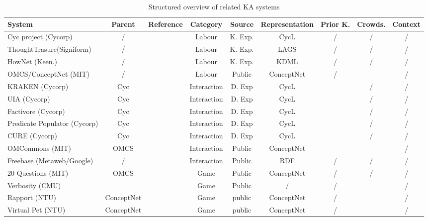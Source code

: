 \begin{landscape}
	\begin{table}[htb]
	\caption{Structured overview of related KA systems}
	\label{tab:related}
	\centering
	\begin{adjustbox}{width=1.6\textwidth}
	
	\begin{tabular}{lclcccccc}
		\hline
		System & Parent & Reference & Category & Source & Representation & Prior K. &  Crowds. & Context \\
		\hline
		Cyc project (Cycorp) & / & \parencite{Lenat1995} & Labour & K. Exp. & CycL & / & / & / \\
		ThoughtTrasure(Signiform) & / & \parencite{Mueller2003} & Labour & K. Exp. & LAGS & / & / & / \\
		HowNet (Keen.) & / & \parencite{Dong2010} & Labour & K. Exp. & KDML & / & / & / \\
		OMCS/ConceptNet (MIT) & / & \parencite{Singh2002a} & Labour & Public & ConceptNet & / & \checkmark & / \\
		KRAKEN (Cycorp) & Cyc & \parencite{Panton2002a} & Interaction & D. Exp & CycL & \checkmark & / & / \\
		UIA (Cycorp) & Cyc & \parencite{Witbrock2003UIA} & Interaction & D. Exp & CycL & \checkmark & / & / \\
		Factivore (Cycorp) & Cyc & \parencite{Witbrock2005} & Interaction & D. Exp & CycL & \checkmark & / & / \\
		Predicate Populator (Cycorp) & Cyc & \parencite{Witbrock2005} & Interaction & D. Exp & CycL & \checkmark & / & / \\
		CURE (Cycorp) & Cyc & \parencite{Witbrock2010} & Interaction & D. Exp & CycL & \checkmark & / & / \\
		OMCommons (MIT) & OMCS & \parencite{Speer2007} & Interaction & Public & ConceptNet & \checkmark & \checkmark & / \\
		Freebase (Metaweb/Google) & / & \parencite{Bollacker2008} & Interaction & Public & RDF & / & / & / \\
		20 Questions (MIT) & OMCS & \parencite{Speer2009} & Game & Public & ConceptNet & / & / & / \\
		Verbosity (CMU) &   & \parencite{VonAhn2006a}  & Game & Public & /  & /  & \checkmark  & /  \\
		Rapport (NTU) & ConceptNet &  \parencite{Kuo2009}  & Game & public  & ConceptNet  & /  & \checkmark  & /  \\
		Virtual Pet (NTU) & ConceptNet  &  \parencite{Kuo2009}  & Game &  public & ConceptNet  & /  & \checkmark  & /  \\

\end{tabular}
\end{adjustbox}
\end{table}
\end{landscape}
